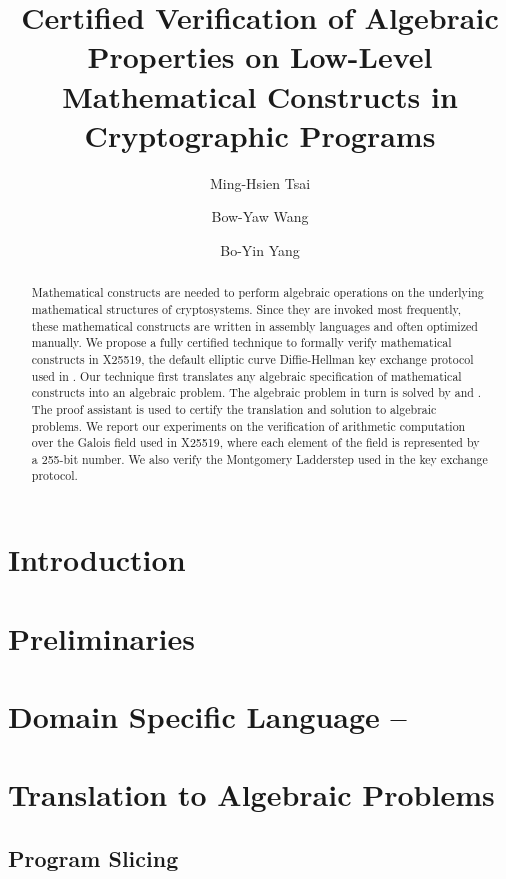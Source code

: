 \documentclass{llncs}
\title{Certified Verification of Algebraic Properties on
Low-Level Mathematical Constructs in Cryptographic Programs}
\author{
Ming-Hsien Tsai
\and
Bow-Yaw Wang
\and
Bo-Yin Yang
%
}
\institute
{
Institute of Information Science\\
Academia Sinica\\
128 Section 2 Academia Road, Taipei 115-29, Taiwan\\
\email{mhtsai208@gmail.com, bywang@iis.sinica.edu.tw, by@crypto.tw}
}
\author{\vspace*{0cm}}
\institute{\vspace*{0cm}\ }
\begin{document}
\maketitle

\begin{abstract}
  Mathematical constructs are needed to perform algebraic operations
  on the underlying mathematical structures of cryptosystems. 
  Since they are invoked most frequently, these mathematical constructs
  are written in assembly languages and often optimized manually. We
  propose a fully certified technique to formally verify mathematical
  constructs in X25519, the default elliptic curve Diffie-Hellman key
  exchange protocol used in \openssh. Our technique first translates any
  algebraic specification of mathematical constructs into an algebraic
  problem. The algebraic 
  problem in turn is solved by \coq and \singular. The proof assistant 
  \coq is used to certify the translation and solution to algebraic
  problems. We report our experiments on the verification of
  arithmetic computation over the Galois field used in X25519, where
  each element of the field is represented by a 255-bit number. We
  also verify the Montgomery Ladderstep used in the key exchange
  protocol.
\end{abstract}

\section{Introduction}
\label{section:introduction}


\section{Preliminaries}
\label{section:preliminaries}


\section{Domain Specific Language -- \mydsl}
\label{section:domain-specific-language}


\section{Translation to Algebraic Problems}
\label{section:translation}


\subsection{Program Slicing}
\label{subsection:translation:slicing}

\end{document}
